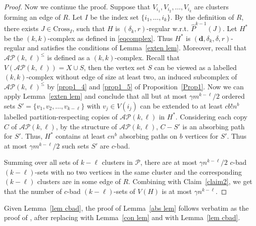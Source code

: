 \documentclass[11pt, reqno]{amsart}    	%
\theoremstyle{definition}
\numberwithin{equation}{section}
\begin{document}
\begin{appendix}
\begin{proof}
			Now we continue the proof.
			Suppose that $V_{i_{1}},V_{i_{2}},\dots,V_{i_{k}}$ are clusters forming an edge of $R$. Let $I$ be the index set $\{i_{1},\dots,i_{k}\}$. By the definition of $ R $, there exists $J\in \text{Cross}_{I}$, such that $H$ is $(\delta_{k},r)$-regular w.r.t. $\hat{P}^{k-1}(J)$. Let $H^{*}$ be the $(k,k)$-complex %
			as defined in \eqref{eqcomplex}. Thus $H^{*}$ is  $(\mathbf{d},\delta_{k},\delta,r)$-regular and satisfies the conditions of Lemma~\ref{exten lem}. Moreover, recall that $\mathcal{AP}(k,\ell)^{\le}$ is defined as a $(k,k)$-complex. Recall that $V(\mathcal{AP}(k,\ell))=X\cup S$, then the vertex set $S$ can be viewed as a labelled $(k,k)$-complex without edge of size at least two,  an induced subcomplex of  $\mathcal{AP}(k,\ell)^{\le}$ by \eqref{prop1_4} and \eqref{prop1_5} of Proposition~\ref{Prop1}. Now we can apply Lemma~\ref{exten lem} and conclude that all but at most  $\gamma m^{k-\ell}/2$ ordered sets $S'=\{v_{1},v_{2},\dots,v_{k-\ell} \}$ with  $v_{j}\in V(i_{j})$ can be  extended to at least $cb!n^{b}$ labelled partition-respecting copies of $\mathcal{AP}(k,\ell)$ in $H^{*}$.
			Considering each copy $C$ of $\mathcal{AP}(k,\ell)$, by the structure of  $\mathcal{AP}(k,\ell)$, $C-S'$ is an absorbing path for $S'$. Thus,  $H^{*}$ contains at least $cn^{b}$ absorbing paths on $b$ vertices for $S'$. Thus at most $\gamma m^{k-\ell}/2$ such sets $S'$ are $c$-bad. 
			
			Summing over all sets of $k-\ell$ clusters in $\mathcal P$, there are at most  $\gamma n^{k-\ell}/2$ $c$-bad $(k-\ell)$-sets with no two vertices in the same cluster and the corresponding $(k-\ell)$ clusters are in some edge of $R$.	Combining with Claim~\ref{claim2}, we get that the number of $c$-bad $(k-\ell)$-sets of  $V(H)$ is at most  $\gamma n^{k-\ell}$. 
		\end{proof}

Given Lemma~\ref{lem cbad}, the proof of Lemma~\ref{abs lem} follows verbatim as the proof of \cite[Lemma 6.3]{Daniela2010Hamilton}, after replacing \cite[Corollary 5.4]{Daniela2010Hamilton} with Lemma~\ref{con lem} and \cite[Lemma 6.2]{Daniela2010Hamilton} with  Lemma~\ref{lem cbad}.
	
	
	
		

\end{appendix}
\end{document}
